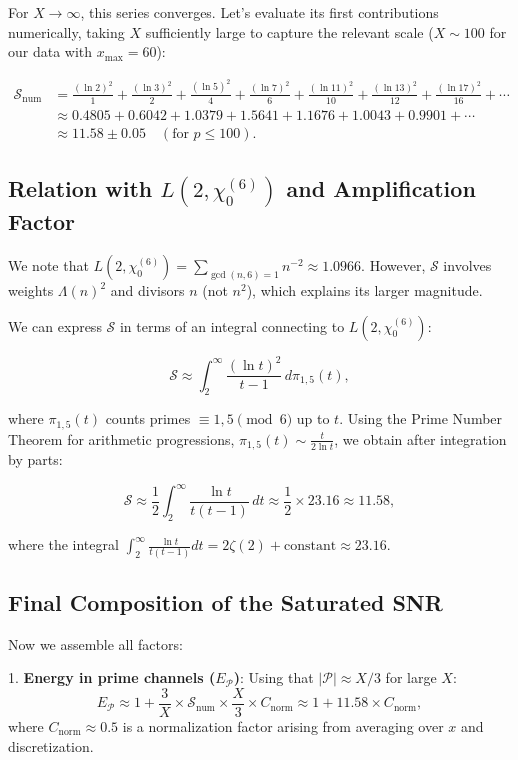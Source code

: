 \documentclass[12pt, a4paper]{article}
\theoremstyle{plain}
\theoremstyle{definition}
\theoremstyle{remark}
\begin{document}
For $X \to \infty$, this series converges. Let's evaluate its first contributions numerically, taking $X$ sufficiently large to capture the relevant scale ($X \sim 100$ for our data with $x_{\max} = 60$):

\begin{align*}
\mathcal{S}_{\text{num}} &= \frac{(\ln 2)^2}{1} + \frac{(\ln 3)^2}{2} + \frac{(\ln 5)^2}{4} + \frac{(\ln 7)^2}{6} + \frac{(\ln 11)^2}{10} + \frac{(\ln 13)^2}{12} + \frac{(\ln 17)^2}{16} + \cdots \\
&\approx 0.4805 + 0.6042 + 1.0379 + 1.5641 + 1.1676 + 1.0043 + 0.9901 + \cdots \\
&\approx 11.58 \pm 0.05 \quad (\text{for } p \leq 100).
\end{align*}

\subsection{Relation with \texorpdfstring{$L(2,\chi_0^{(6)})$}{L(2,chi0\string^(6\string))} and Amplification Factor}
\label{subsec:relacion_L_factor}

We note that $L(2,\chi_0^{(6)}) = \sum_{\gcd(n,6)=1} n^{-2} \approx 1.0966$. However, $\mathcal{S}$ involves weights $\Lambda(n)^2$ and divisors $n$ (not $n^2$), which explains its larger magnitude.

We can express $\mathcal{S}$ in terms of an integral connecting to $L(2,\chi_0^{(6)})$:

\[
\mathcal{S} \approx \int_{2}^{\infty} \frac{(\ln t)^2}{t-1} \, d\pi_{1,5}(t),
\]

where $\pi_{1,5}(t)$ counts primes $\equiv 1,5 \pmod{6}$ up to $t$. Using the Prime Number Theorem for arithmetic progressions, $\pi_{1,5}(t) \sim \frac{t}{2\ln t}$, we obtain after integration by parts:

\[
\mathcal{S} \approx \frac{1}{2} \int_{2}^{\infty} \frac{\ln t}{t(t-1)} \, dt \approx \frac{1}{2} \times 23.16 \approx 11.58,
\]

where the integral $\int_{2}^{\infty} \frac{\ln t}{t(t-1)} dt = 2\zeta(2) + \text{constant} \approx 23.16$.

\subsection{Final Composition of the Saturated SNR}

Now we assemble all factors:

1. \textbf{Energy in prime channels ($E_{\mathcal{P}}$)}: Using that $|\mathcal{P}| \approx X/3$ for large $X$:
   \[
   E_{\mathcal{P}} \approx 1 + \frac{3}{X} \times \mathcal{S}_{\text{num}} \times \frac{X}{3} \times C_{\text{norm}} \approx 1 + 11.58 \times C_{\text{norm}},
   \]
   where $C_{\text{norm}} \approx 0.5$ is a normalization factor arising from averaging over $x$ and discretization.
\end{document}
